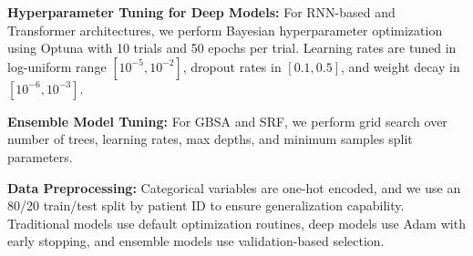 \textbf{Hyperparameter Tuning for Deep Models:} For RNN-based and Transformer architectures, we perform Bayesian hyperparameter optimization using Optuna with 10 trials and 50 epochs per trial. Learning rates are tuned in log-uniform range $[10^{-5}, 10^{-2}]$, dropout rates in $[0.1, 0.5]$, and weight decay in $[10^{-6}, 10^{-3}]$.

\textbf{Ensemble Model Tuning:} For GBSA and SRF, we perform grid search over number of trees, learning rates, max depths, and minimum samples split parameters.

\textbf{Data Preprocessing:} Categorical variables are one-hot encoded, and we use an 80/20 train/test split by patient ID to ensure generalization capability. Traditional models use default optimization routines, deep models use Adam with early stopping, and ensemble models use validation-based selection.